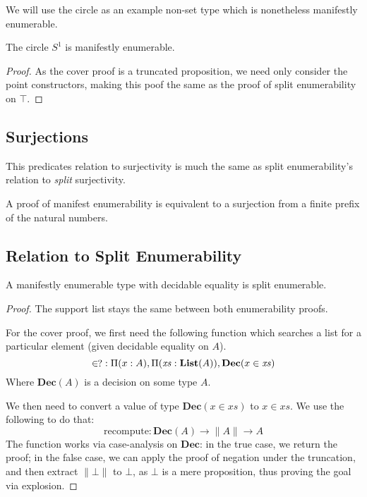 We will use the circle as an example non-set type which is nonetheless
manifestly enumerable.
\begin{rm-theorem}
  The circle \(S^1\) is manifestly enumerable.
\end{rm-theorem}
\begin{proof}
  As the cover proof is a truncated proposition, we need only consider the point
  constructors, making this poof the same as the proof of split enumerability on
  \(\top\).
\end{proof}
\subsection{Surjections}
This predicates relation to surjectivity is much the same as split
enumerability's relation to \emph{split} surjectivity.
\begin{rm-lemma}
  A proof of manifest enumerability is equivalent to a surjection from a finite
  prefix of the natural numbers.
\end{rm-lemma}
\subsection{Relation to Split Enumerability}
\begin{rm-theorem} \label{manifest-enum-to-split}
  A manifestly enumerable type with decidable equality is split enumerable.
\end{rm-theorem}
\begin{proof}
  The support list stays the same between both enumerability proofs.

  For the cover proof, we first need the following function which searches a
  list for a particular element (given decidable equality on \(A\)).
  \begin{equation}
    \decin \; : \Pi(x : A) , \Pi(\mathit{xs} : \mathbf{List}(A)) , \mathbf{Dec}(x \in \mathit{xs})
  \end{equation}
  Where \(\mathbf{Dec}(A)\) is a decision on some type \(A\).

  We then need to convert a value of type \(\mathbf{Dec}(x \in \mathit{xs})\) to
  \(x \in \mathit{xs}\).
  We use the following to do that:
  \begin{equation}
    \text{recompute} : \mathbf{Dec}(A) \rightarrow \lVert A \rVert \rightarrow A
  \end{equation}
  The function works via case-analysis on \(\mathbf{Dec}\): in the true case, we
  return the proof; in the false case, we can apply the proof of negation under
  the truncation, and then extract \(\lVert \bot \rVert\) to \(\bot\), as
  \(\bot\) is a mere proposition, thus proving the goal via explosion.
\end{proof}
